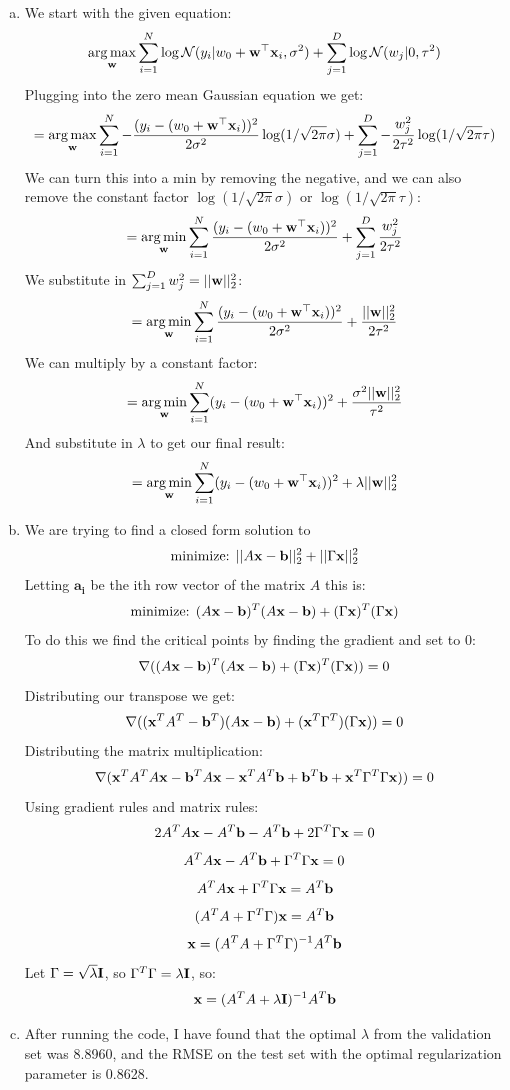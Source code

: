 \documentclass[12pt,letterpaper]{hmcpset}
\begin{document}
\begin{solution}
\begin{enumerate}[(a)]
    \item We start with the given equation:
    \[
	\operatorname*{arg\,max}_{\bf w} \sum_{i=1}^N \log{\cal N}(y_i | w_0 + {\bf w}^\top{\bf x}_i, \sigma^2) + \sum_{j=1}^D \log{\cal N}(w_j | 0, \tau^2)
	\]
	Plugging into the zero mean Gaussian equation we get:
	\[=
	\operatorname*{arg\,max}_{\bf w} \sum_{i=1}^N -\frac{(y_i-(w_0+{\bf w}^\top{\bf x}_i))^2}{2\sigma^2}\log (1/\sqrt{2\pi}\sigma) + \sum_{j=1}^D -\frac{w_j^2}{2\tau^2}\log (1/\sqrt{2\pi}\tau)
	\]
	We can turn this into a min by removing the negative, and we can also remove the constant factor $\log (1/\sqrt{2\pi}\sigma)$ or $\log (1/\sqrt{2\pi}\tau)$:
	\[=
	\operatorname*{arg\,min}_{\bf w} \sum_{i=1}^N \frac{(y_i-(w_0+{\bf w}^\top{\bf x}_i))^2}{2\sigma^2} + \sum_{j=1}^D \frac{w_j^2}{2\tau^2}
	\]
	We substitute in $\sum_{j=1}^D w_j^2 = ||{\bf w}||_2^2$:
	\[=
	\operatorname*{arg\,min}_{\bf w} \sum_{i=1}^N \frac{(y_i-(w_0+{\bf w}^\top{\bf x}_i))^2}{2\sigma^2} + \frac{||{\bf w}||_2^2}{2\tau^2}
	\]
	We can multiply by a constant factor:
	\[=
	\operatorname*{arg\,min}_{\bf w} \sum_{i=1}^N (y_i-(w_0+{\bf w}^\top{\bf x}_i))^2 + \frac{\sigma^2||{\bf w}||_2^2}{\tau^2}
	\]
	And substitute in $\lambda$ to get our final result:
	\[=
	\operatorname*{arg\,min}_{\bf w} \sum_{i=1}^N (y_i-(w_0+{\bf w}^\top{\bf x}_i))^2 + \lambda ||{\bf w}||_2^2
	\]
	\item We are trying to find a closed form solution to 
	\[
	\text{minimize: } ||A{\bf x} - {\bf b}||_2^2 + ||\Gamma{\bf x}||_2^2
	\]
	Letting $\mathbf{a_i}$ be the ith row vector of the matrix $A$ this is:
	\[
	\text{minimize: } (A{\bf x} - {\bf b})^T(A{\bf x} - {\bf b}) + (\Gamma{\bf x})^T(\Gamma{\bf x})
	\]
	To do this we find the critical points by finding the gradient and set to 0:
	\[
	\nabla((A{\bf x} - {\bf b})^T(A{\bf x} - {\bf b}) + (\Gamma{\bf x})^T(\Gamma{\bf x})) = 0
	\]
	Distributing our transpose we get:
	\[
	\nabla(({\bf x}^TA^T - {\bf b}^T)(A{\bf x} - {\bf b}) + ({\bf x}^T\Gamma^T)(\Gamma{\bf x})) = 0
	\]
	Distributing the matrix multiplication:
	\[
	\nabla({\bf x}^TA^TA{\bf x} - {\bf b}^TA{\bf x} - {\bf x}^TA^T{\bf b} + {\bf b}^T{\bf b} + {\bf x}^T\Gamma^T\Gamma{\bf x})) = 0
	\]
	Using gradient rules and matrix rules:
	\[
	2A^TA{\bf x} - A^T{\bf b} - A^T{\bf b} + 2\Gamma^T\Gamma{\bf x} = 0
	\]
	\[
	A^TA{\bf x} - A^T{\bf b} + \Gamma^T\Gamma{\bf x} = 0
	\]
	\[
	A^TA{\bf x} + \Gamma^T\Gamma{\bf x} = A^T{\bf b}
	\]
	\[
	(A^TA + \Gamma^T\Gamma){\bf x} = A^T{\bf b}
	\]
	\[
	{\bf x} = (A^TA + \Gamma^T\Gamma)^{-1}A^T{\bf b}
	\]
	Let $\Gamma = \sqrt{\lambda}{\bf I}$, so $\Gamma^T\Gamma = \lambda{\bf I}$, so:
	\[
	{\bf x} = (A^TA + \lambda{\bf I})^{-1}A^T{\bf b}
	\]
	\item After running the code, I have found that the optimal $\lambda$ from the validation set was 8.8960, and the RMSE on the test set with the optimal regularization parameter is  0.8628.\newline

\end{enumerate}
\end{solution}
\end{document}
